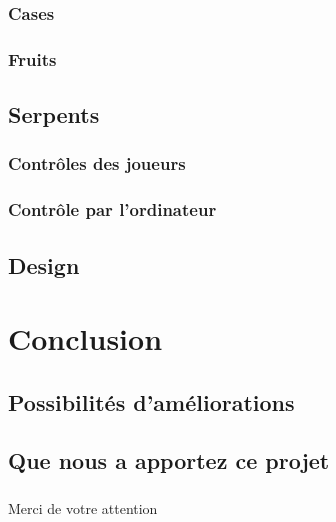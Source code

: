 \documentclass{beamer}
\begin{document}
\subsubsection{Cases}
\subsubsection{Fruits}

\subsection{Serpents}
\subsubsection{Contrôles des joueurs}
\subsubsection{Contrôle par l'ordinateur}

\subsection{Design}
\begin{frame}
\frametitle{\insertsubsection}
\framesubtitle{\insertsection}

\end{frame}


\section{Conclusion}
\subsection{Possibilités d'améliorations}
\begin{frame}
\frametitle{\insertsubsection}
\framesubtitle{\insertsection}

\end{frame}
\subsection{Que nous a apportez ce projet}
\begin{frame}
\frametitle{\insertsubsection}
\framesubtitle{\insertsection}

\end{frame}

\begin{frame}
\begin{center}
	Merci de votre attention
\end{center}
\end{frame}
\end{document}
